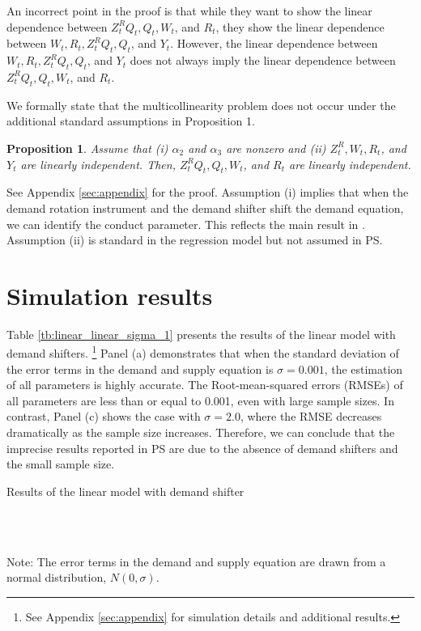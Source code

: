 \documentclass[11pt, a4paper]{article}
\newtheorem{proposition}{Proposition}
\begin{document}
An incorrect point in the proof is that while they want to show the linear dependence between $Z^{R}_{t}Q_{t}, Q_{t}, W_{t}$, and $R_{t}$, they show the linear dependence between $W_{t}, R_{t}, Z^{R}_{t}Q_{t}, Q_{t}$, and $Y_t$. 
However, the linear dependence between $W_{t}, R_{t}, Z^{R}_{t}Q_{t}, Q_{t}$, and $Y_t$ does not always imply the linear dependence between $Z^{R}_{t}Q_{t}, Q_{t}, W_{t}$, and $R_{t}$.

We formally state that the multicollinearity problem does not occur under the additional standard assumptions in Proposition 1.
\begin{proposition}
    Assume that (i) $\alpha_2$ and $\alpha_3$ are nonzero and (ii) $Z^R_t, W_t, R_t$, and $Y_t$ are linearly independent.
    Then, $Z^{R}_{t}Q_{t}, Q_{t}, W_{t}$, and $R_{t}$ are linearly independent.
\end{proposition}

See Appendix \ref{sec:appendix} for the proof.
Assumption (i) implies that when the demand rotation instrument and the demand shifter shift the demand equation, we can identify the conduct parameter.
This reflects the main result in \citet{bresnahan1982oligopoly}.
Assumption (ii) is standard in the regression model but not assumed in PS.


\section{Simulation results}\label{sec:results}

Table \ref{tb:linear_linear_sigma_1} presents the results of the linear model with demand shifters.
\footnote{See Appendix \ref{sec:appendix} for simulation details and additional results.} 
Panel (a) demonstrates that when the standard deviation of the error terms in the demand and supply equation is $\sigma = 0.001$, the estimation of all parameters is highly accurate. 
The Root-mean-squared errors (RMSEs) of all parameters are less than or equal to 0.001, even with large sample sizes. 
In contrast, Panel (c) shows the case with $\sigma = 2.0$, where the RMSE decreases dramatically as the sample size increases. 
Therefore, we can conclude that the imprecise results reported in PS are due to the absence of demand shifters and the small sample size.



\begin{table}[!htbp]
  \begin{center}
      \caption{Results of the linear model with demand shifter}
      \label{tb:linear_linear_sigma_1} 
      \subfloat[$\sigma=0.001$]{}\\
      \subfloat[$\sigma=0.5$]{}\\
    \subfloat[$\sigma=2.0$]{}
  \end{center}
  \footnotesize
  Note: The error terms in the demand and supply equation are drawn from a normal distribution, $N(0,\sigma)$.
\end{table} 
\end{document}
